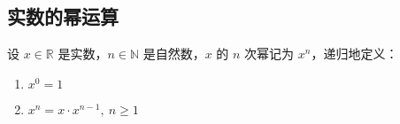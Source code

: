 

\vspace{1em}

\subsection{实数的幂运算}

\begin{definition}[实数的自然数次幂]
    设 $x\in\mathbb{R}$ 是实数，$n\in\mathbb{N}$ 是自然数，$x$ 的 $n$ 次幂记为 $x^n$，递归地定义：
    \begin{enumerate}
        \item $x^0 = 1$
        \item $x^n = x \cdot x^{n-1},\ n\ge 1$
    \end{enumerate}
\end{definition}

